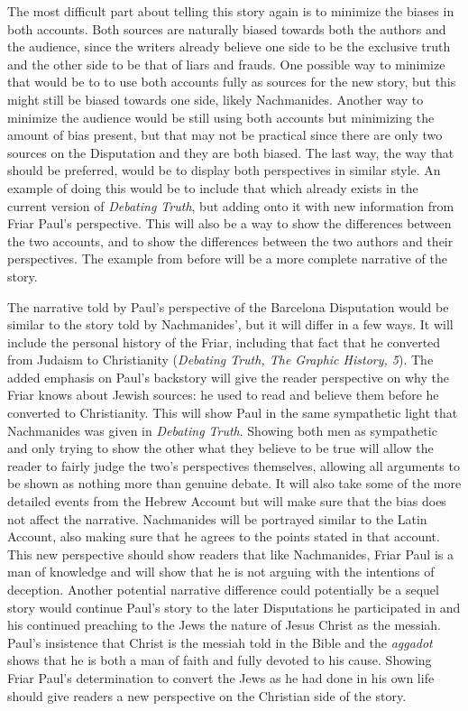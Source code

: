 \documentclass[12pt]{article}
\begin{document}
The most difficult part about telling this story again is to minimize the biases in both accounts.
Both sources are naturally biased towards both the authors and the audience, since the writers already believe one side to be the exclusive truth and the other side to be that of liars and frauds.
One possible way to minimize that would be to to use both accounts fully as sources for the new story, but this might still be biased towards one side, likely Nachmanides. 
Another way to minimize the audience would be still using both accounts but minimizing the amount of bias present, but that may not be practical since there are only two sources on the Disputation and they are both biased.
The last way, the way that should be preferred, would be to display both perspectives in similar style.
An example of doing this would be to include that which already exists in the current version of \emph{Debating Truth}, but adding onto it with new information from Friar Paul's perspective.
This will also be a way to show the differences between the two accounts, and to show the differences between the two authors and their perspectives.
The example from before will be a more complete narrative of the story.

The narrative told by Paul's perspective of the Barcelona Disputation would be similar to the story told by Nachmanides', but it will differ in a few ways.
It will include the personal history of the Friar, including that fact that he converted from Judaism to Christianity (\emph{Debating Truth, The Graphic History, 5}).
The added emphasis on Paul's backstory will give the reader perspective on why the Friar knows about Jewish sources: he used to read and believe them before he converted to Christianity.
This will show Paul in the same sympathetic light that Nachmanides was given in \emph{Debating Truth}.
Showing both men as sympathetic and only trying to show the other what they believe to be true will allow the reader to fairly judge the two's perspectives themselves, allowing all arguments to be shown as nothing more than genuine debate.
It will also take some of the more detailed events from the Hebrew Account but will make sure that the bias does not affect the narrative.
Nachmanides will be portrayed similar to the Latin Account, also making sure that he agrees to the points stated in that account.
This new perspective should show readers that like Nachmanides, Friar Paul is a man of knowledge and will show that he is not arguing with the intentions of deception.
Another potential narrative difference could potentially be a sequel story would continue Paul's story to the later Disputations he participated in and his continued preaching to the Jews the nature of Jesus Christ as the messiah.
Paul's insistence that Christ is the messiah told in the Bible and the \emph{aggadot} shows that he is both a man of faith and fully devoted to his cause.
Showing Friar Paul's determination to convert the Jews as he had done in his own life should give readers a new perspective on the Christian side of the story.
\end{document}
